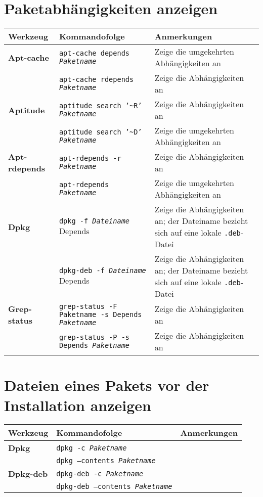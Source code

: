 \documentclass[10pt,a4paper]{article}
\begin{document}
\section{Paketabhängigkeiten anzeigen}
\begin{tabular}{ p{3.5cm} p{9.6cm} p{11cm}}
  \hline
  \rowcolor{Gray}
  \textbf{Werkzeug} & \textbf{Kommandofolge} & \textbf{Anmerkungen} \\
  \hline 
  \textbf{Apt-cache} & \texttt{apt-cache depends \textit{Paketname}} & Zeige die umgekehrten Abhängigkeiten an \\
  \rowcolor{Gray}
  & \texttt{apt-cache rdepends \textit{Paketname}} & Zeige die Abhängigkeiten an \\
  \textbf{Aptitude} & \texttt{aptitude search '\textasciitilde{R}' \textit{Paketname}} & Zeige die Abhängigkeiten an \\
  \rowcolor{Gray}
  & \texttt{aptitude search '\textasciitilde{D}' \textit{Paketname}} & Zeige die umgekehrten Abhängigkeiten an\\
  \textbf{Apt-rdepends} & \texttt{apt-rdepends -r \textit{Paketname}} & Zeige die Abhängigkeiten an \\
  \rowcolor{Gray}
  & \texttt{apt-rdepends \textit{Paketname}} & Zeige die umgekehrten Abhängigkeiten an \\
  \textbf{Dpkg} & \texttt{dpkg -f \textit{Dateiname}} Depends & Zeige die Abhängigkeiten an; der Dateiname bezieht sich auf eine lokale \texttt{.deb}-Datei \\
  \rowcolor{Gray}
  & \texttt{dpkg-deb -f \textit{Dateiname}} Depends & Zeige die Abhängigkeiten an; der Dateiname bezieht sich auf eine lokale \texttt{.deb}-Datei \\
  \textbf{Grep-status} & \texttt{grep-status -F Paketname -s Depends \textit{Paketname}} & Zeige die Abhängigkeiten an \\
  \rowcolor{Gray}
  & \texttt{grep-status -P -s Depends \textit{Paketname}} & Zeige die Abhängigkeiten an \\
  \hline
\end{tabular}

\section{Dateien eines Pakets vor der Installation anzeigen}
\begin{tabular}{ p{3.5cm} p{9.6cm} p{11cm}}
  \hline
  \rowcolor{Gray}
  \textbf{Werkzeug} & \textbf{Kommandofolge} & \textbf{Anmerkungen} \\
  \hline 
  \textbf{Dpkg} & \texttt{dpkg -c \textit{Paketname}} & \\
  \rowcolor{Gray}
  & \texttt{dpkg --contents \textit{Paketname}} & \\
  \textbf{Dpkg-deb} & \texttt{dpkg-deb -c \textit{Paketname}} & \\
  \rowcolor{Gray}
  & \texttt{dpkg-deb --contents \textit{Paketname}} & \\
  \hline
\end{tabular}
\end{document}
